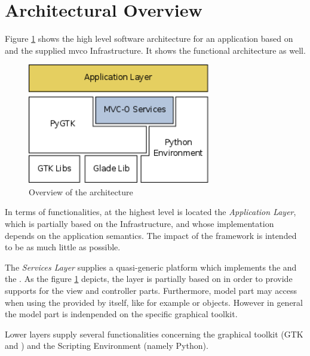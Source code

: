 \section{\label{ARCH} Architectural Overview}

Figure \ref{HLA_f} shows the high level software architecture for an
application based on \pygtk and the supplied {mvco} Infrastructure. It
shows the functional architecture as well.

\begin{figure}[htbp]
\begin{center}
\includegraphics[width=8cm]{figs/png/arch}
\caption{\label{HLA_f}Overview of the architecture}
\end{center}
\end{figure}



In terms of functionalities, at the highest level is located the
\emph{Application Layer}, which is partially based on the \mvco
Infrastructure, and whose implementation depends on the application
semantics. The impact of the framework is intended to be as much
little as possible. 

The \emph{\mvco Services Layer} supplies a quasi-generic platform
which implements the \mvc and the \obs. As the figure \ref{HLA_f}
depicts, the \mvco layer is partially based on \pygtk in order to
provide supports for the view and controller parts. Furthermore, model
part may access \pygtk when using the \mvc provided by \pygtk itself,
like for example  or 
objects. However in general the model part is indenpended on the
specific graphical toolkit.

Lower layers supply several functionalities concerning the graphical
toolkit (GTK and \glade) and the Scripting Environment (namely
Python).



